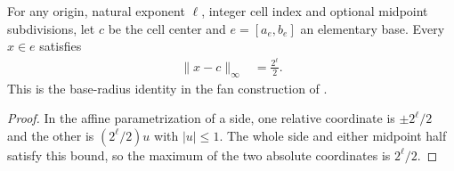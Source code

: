 
\begin{lemma}
    \label{thm:area_law_cell_fan_base_radius}
    \leanok
    For any origin, natural exponent $\ell$, integer cell index and
    optional midpoint subdivisions, let $c$ be the cell center and
    $e=[a_e,b_e]$ an elementary base. Every $x\in e$ satisfies
    \begin{align}
        \|x-c\|_\infty & =\frac{2^\ell}{2}.
    \end{align}
    This is the base-radius identity in the fan construction
    of \cite[Section~11]{OpenAI2026AreaLaw}.
\end{lemma}
\begin{proof}\leanok
    In the affine parametrization of a side, one relative coordinate
    is $\pm2^\ell/2$ and the other is $(2^\ell/2)u$ with $|u|\le1$.
    The whole side and either midpoint half satisfy this bound, so
    the maximum of the two absolute coordinates is $2^\ell/2$.
\end{proof}
